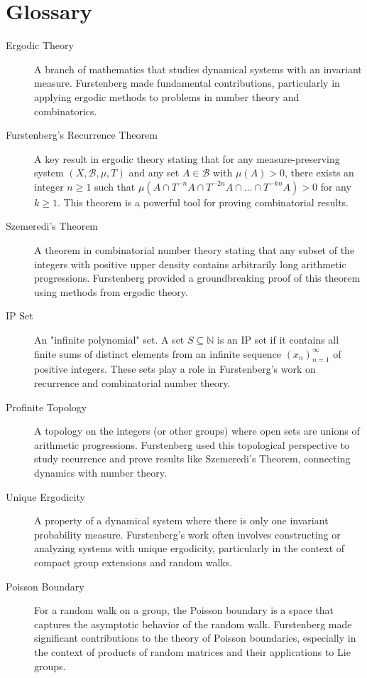 \section*{Glossary}
\begin{description}
    \item[Ergodic Theory] A branch of mathematics that studies dynamical systems with an invariant measure. Furstenberg made fundamental contributions, particularly in applying ergodic methods to problems in number theory and combinatorics.
    \item[Furstenberg's Recurrence Theorem] A key result in ergodic theory stating that for any measure-preserving system $(X, \mathcal{B}, \mu, T)$ and any set $A \in \mathcal{B}$ with $\mu(A) > 0$, there exists an integer $n \ge 1$ such that $\mu(A \cap T^{-n}A \cap T^{-2n}A \cap \dots \cap T^{-kn}A) > 0$ for any $k \ge 1$. This theorem is a powerful tool for proving combinatorial results.
    \item[Szemeredi's Theorem] A theorem in combinatorial number theory stating that any subset of the integers with positive upper density contains arbitrarily long arithmetic progressions. Furstenberg provided a groundbreaking proof of this theorem using methods from ergodic theory.
    \item[IP Set] An "infinite polynomial" set. A set $S \subseteq \mathbb{N}$ is an IP set if it contains all finite sums of distinct elements from an infinite sequence $(x_n)_{n=1}^\infty$ of positive integers. These sets play a role in Furstenberg's work on recurrence and combinatorial number theory.
    \item[Profinite Topology] A topology on the integers (or other groups) where open sets are unions of arithmetic progressions. Furstenberg used this topological perspective to study recurrence and prove results like Szemeredi's Theorem, connecting dynamics with number theory.
    \item[Unique Ergodicity] A property of a dynamical system where there is only one invariant probability measure. Furstenberg's work often involves constructing or analyzing systems with unique ergodicity, particularly in the context of compact group extensions and random walks.
    \item[Poisson Boundary] For a random walk on a group, the Poisson boundary is a space that captures the asymptotic behavior of the random walk. Furstenberg made significant contributions to the theory of Poisson boundaries, especially in the context of products of random matrices and their applications to Lie groups.
\end{description}

